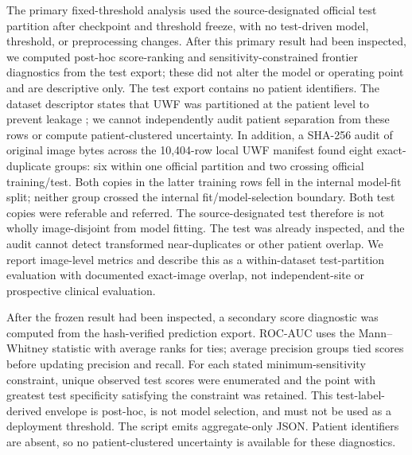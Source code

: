 \documentclass[11pt]{article}
\begin{document}
The primary fixed-threshold analysis used the source-designated official test partition after checkpoint and threshold freeze, with no test-driven model, threshold, or preprocessing changes. After this primary result had been inspected, we computed post-hoc score-ranking and sensitivity-constrained frontier diagnostics from the test export; these did not alter the model or operating point and are descriptive only. The test export contains no patient identifiers. The dataset descriptor states that UWF was partitioned at the patient level to prevent leakage \cite{mmrdr}; we cannot independently audit patient separation from these rows or compute patient-clustered uncertainty. In addition, a SHA-256 audit of original image bytes across the 10,404-row local UWF manifest found eight exact-duplicate groups: six within one official partition and two crossing official training/test. Both copies in the latter training rows fell in the internal model-fit split; neither group crossed the internal fit/model-selection boundary. Both test copies were referable and referred. The source-designated test therefore is not wholly image-disjoint from model fitting. The test was already inspected, and the audit cannot detect transformed near-duplicates or other patient overlap. We report image-level metrics and describe this as a within-dataset test-partition evaluation with documented exact-image overlap, not independent-site or prospective clinical evaluation.

After the frozen result had been inspected, a secondary score diagnostic was computed from the hash-verified prediction export. ROC-AUC uses the Mann--Whitney statistic with average ranks for ties; average precision groups tied scores before updating precision and recall. For each stated minimum-sensitivity constraint, unique observed test scores were enumerated and the point with greatest test specificity satisfying the constraint was retained. This test-label-derived envelope is post-hoc, is not model selection, and must not be used as a deployment threshold. The script emits aggregate-only JSON. Patient identifiers are absent, so no patient-clustered uncertainty is available for these diagnostics.
\end{document}
